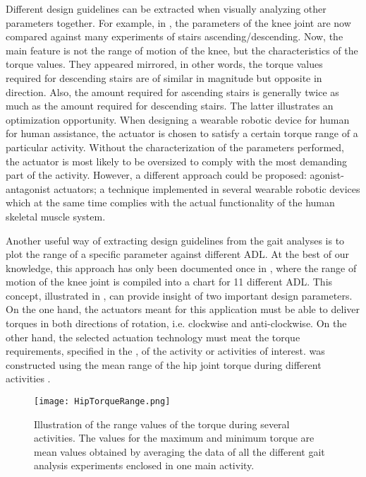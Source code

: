 Different design guidelines can be extracted when visually analyzing other parameters together. For example, in  , the parameters of the knee joint are now compared against many experiments of stairs ascending/descending. Now, the main feature is not the range of motion of the knee, but the characteristics of the torque values. They appeared mirrored, in other words, the torque values required for descending stairs are of similar in magnitude but opposite in direction. Also, the amount required for ascending stairs is generally twice as much as the amount required for descending stairs. The latter illustrates an optimization opportunity. When designing a wearable robotic device for human for human assistance, the actuator is chosen to satisfy a certain torque range of a particular activity. Without the characterization of the parameters performed, the actuator is most likely to be oversized to comply with the most demanding part of the activity. However, a different approach could be proposed: agonist-antagonist actuators; a technique implemented in several wearable robotic devices which at the same time complies with the actual functionality of the human skeletal muscle system.

Another useful way of extracting design guidelines from the gait analyses is to plot the range of a specific parameter against different ADL. At the best of our knowledge, this approach has only been documented once in \cite{rowe2000knee}, where the range of motion of the knee joint is compiled into a chart for 11 different ADL. This concept, illustrated in , can provide insight of two important design parameters. On the one hand, the actuators meant for this application must be able to deliver torques in both directions of rotation, i.e. clockwise and anti-clockwise. On the other hand, the selected actuation technology must meat the torque requirements, specified in the , of the activity or activities of interest.  was constructed using the mean range of the hip joint torque during different activities \cite{bovi2011multiple,lee2008biomechanics,han2011biomechanical,protopapadaki2007hip,riener2002stair,mcintosh2006gait,roebroeck1994biomechanics,mak2003joint}.

\begin{figure}[htbp!]
    \centering
    \texttt{[image: HipTorqueRange.png]}
    \caption{Illustration of the range values of the torque during several activities. The values for the maximum and minimum torque are mean values obtained by averaging the data of all the different gait analysis experiments enclosed in one main activity. \cite{bovi2011multiple,lee2008biomechanics,han2011biomechanical,protopapadaki2007hip,riener2002stair,mcintosh2006gait,roebroeck1994biomechanics,mak2003joint,solis2017characterization} }
    \label{fig:HipTorqueRange}
\end{figure}

